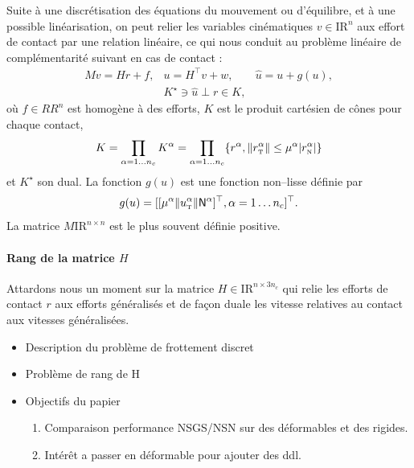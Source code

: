 \documentclass{CSMA2017}
\def\RR{\nbR}
\def\nbR{\ensuremath{\mathrm{I\!R}}} %
\def\n{{\hbox{\tiny{N}}}}
\def\t{{\hbox{\tiny{T}}}}
\begin{document}
Suite à une discrétisation des équations du mouvement ou d'équilibre, et à une possible linéarisation, on peut relier les variables cinématiques $ {v} \in \RR^n$ aux effort de contact par une relation linéaire, ce qui nous conduit au problème linéaire de complémentarité suivant en cas de contact :
\begin{equation}\label{eq:soccp1-intro}
  \begin{array}{rcl}
    M v = {H} {r} + {f}, &
    u = H^\top v + w,  &
    \hat u = u + g(u) ,\\[1mm]
    &    K^\star \ni {\hat u} \perp r \in K,&
  \end{array}
\end{equation}
où $f\in RR^n$ est homogène à des efforts, $K$ est le produit cartésien de cônes pour chaque contact, 
\begin{equation}
  \label{eq:CC}
  K = \prod_{\alpha=1\ldots n_c} K^{\alpha}  = \prod_{\alpha=1\ldots n_c} \{r^\alpha, \|r^\alpha_\t \| \leq \mu^\alpha |r^\alpha_\n| \}
\end{equation}
et $K^\star$ son dual. La fonction $g(u)$ est une fonction non--lisse définie par 
\begin{equation}
g(u) = [[\mu^\alpha  \|u^\alpha_\t\| {\sf N}^\alpha]^\top, \alpha = 1\ldots n_c]^\top\label{eq:gg}. 
\end{equation}
La matrice $M \RR^{n \times n}$ est le plus souvent définie positive.


\paragraph{Rang de la matrice $H$} Attardons nous un moment sur la matrice $H \in \RR^{n\times 3n_c} $ qui relie les efforts de contact $r$ aux efforts généralisés et de façon duale les vitesse relatives au contact aux vitesses généralisées. 

\clearpage
\begin{itemize}
\item Description du problème de frottement discret
\item Problème de rang de H
\item Objectifs du papier
  \begin{enumerate}
  \item Comparaison performance NSGS/NSN sur des déformables et des rigides.
  \item Intérêt a passer en déformable pour ajouter des ddl.
  \end{enumerate}
\end{itemize}
\end{document}

